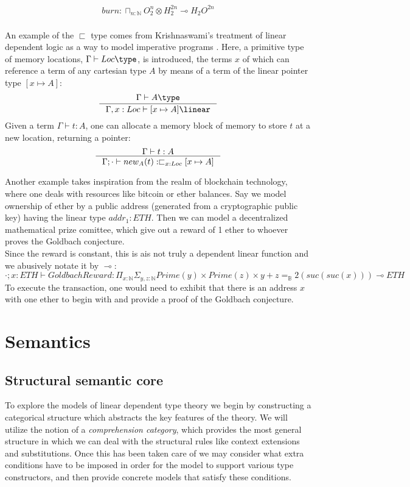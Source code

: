 \[
  \begin{split}
  burn : \sqcap_{n : \mathbb{N}}O_2^n \otimes H_2^{2n} \multimap H_2O^{2n}
  \end{split}
\]
\\
An example of the $\sqsubset$ type comes from Krishnaswami's treatment of linear dependent logic as a way to model imperative programs \cite{krishnaswami}. Here, a primitive type of memory locations, $\Gamma \vdash Loc \type$, is introduced, the terms $x$ of which can reference a term of any cartesian type $A$ by means of a term of the linear pointer type $[x \mapsto A]$:
\[ 
  \inference{\Gamma \vdash A \type}
  {\Gamma, x : Loc \vdash [x \mapsto A] \linear}
\]
Given a term $\Gamma \vdash t : A$, one can allocate a memory block of memory to store $t$ at a new location, returning a pointer:
\[
  \inference{\Gamma \vdash t : A}
  {\Gamma; \cdot \vdash new_A (t) : \sqsubset_{x : Loc} [x \mapsto A]}
\]


Another example takes inspiration from the realm of blockchain technology, where one deals with resources like bitcoin or ether balances. Say we model ownership of ether by a public address (generated from a cryptographic public key) having the linear type $addr_1 : ETH$. Then we can model a decentralized  mathematical prize comittee, which give out a reward of 1 ether to whoever proves the Goldbach conjecture.\\
Since the reward is constant, this is ais not truly a dependent linear function and we abusively notate it by $\multimap$:
\[
\cdot; x : ETH \vdash GoldbachReward: \Pi_{x : \mathbb{N}}\Sigma_{y, z : \mathbb{N}}Prime(y) \times Prime(z) \times y + z =_{\mathbb{B}} 2(suc(suc(x))) \multimap ETH
\]
To execute the transaction, one would need to exhibit that there is an address $x$ with one ether to begin with and provide a proof of the Goldbach conjecture.
\section{Semantics}
\subsection{Structural semantic core}
To explore the models of linear dependent type theory we begin by constructing a categorical structure which abstracts the key features of the theory. We will utilize the notion of a \textit{comprehension category}, which provides the most general structure in which we can deal with the structural rules like context extensions and substitutions. Once this has been taken care of we may consider what extra conditions have to be imposed in order for the model to support various type constructors, and then provide concrete models that satisfy these conditions.\\

